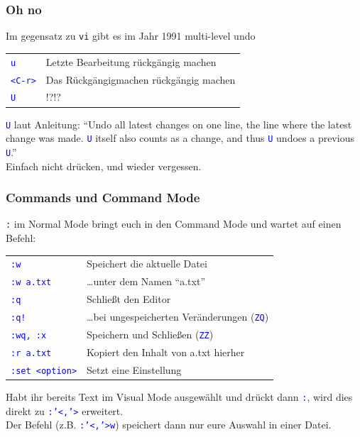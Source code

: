 \documentclass{beamer}
\newcommand{\cmd}[1]{\textcolor{blue}{\texttt{#1}}}
\begin{document}
\begin{frame}
  \frametitle{Oh no}
  Im gegensatz zu \texttt{vi} gibt es im Jahr 1991 multi-level undo \\[0.5cm]
  \begin{tabular}{l | l}
    \cmd{u} & Letzte Bearbeitung rückgängig machen \\[0.2cm]
    \cmd{<C-r>} & Das Rückgängigmachen rückgängig machen \\[0.2cm]
    \cmd{U} & !?!? \\[0.2cm]
  \end{tabular}

  \vspace{0.5cm}

  \cmd{U} laut Anleitung: \enquote{Undo all latest changes on one line, the line where the latest change was made.
  \cmd{U} itself also counts as a change, and thus \cmd{U} undoes a previous \cmd{U}.} \\
  Einfach nicht drücken, und wieder vergessen.
\end{frame}

\begin{frame}
  \frametitle{Commands und Command Mode}
  \cmd{:} im Normal Mode bringt euch in den Command Mode und wartet auf einen Befehl: \\[0.5cm]

  \begin{tabular}{l | l}
    \cmd{:w} & Speichert die aktuelle Datei \\[0.2cm]
    \cmd{:w a.txt} & \dots unter dem Namen \enquote{a.txt} \\[0.2cm]
    \cmd{:q} & Schließt den Editor \\[0.2cm]
    \cmd{:q!} & \dots bei ungespeicherten Veränderungen (\cmd{ZQ}) \\[0.2cm]
    \cmd{:wq, :x} & Speichern und Schließen (\cmd{ZZ}) \\[0.2cm]
    \cmd{:r a.txt} & Kopiert den Inhalt von a.txt hierher \\[0.2cm]
    \cmd{:set <option>} & Setzt eine Einstellung
  \end{tabular}

  \vspace{0.5cm}

  Habt ihr bereits Text im Visual Mode ausgewählt und drückt dann \cmd{:}, wird dies direkt zu \cmd{:'<,'>} erweitert. \\
  Der Befehl (z.B. \cmd{:'<,'>w}) speichert dann nur eure Auswahl in einer Datei.
\end{frame}
\end{document}
